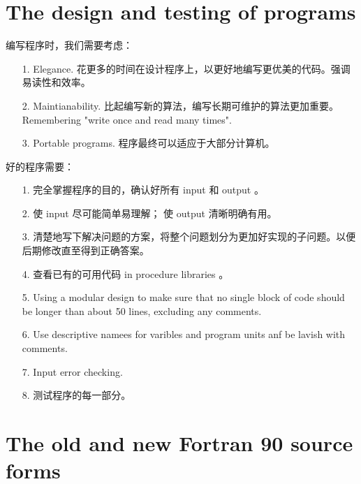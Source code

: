 \documentclass[a4paper,titlepage]{report}
\theoremstyle{definition}
\begin{document}
\section{The design and testing of programs}

编写程序时，我们需要考虑：
\begin{itemize}
  \item[1.]
  Elegance. 花更多的时间在设计程序上，以更好地编写更优美的代码。强调易读性和效率。

  \item[2.]
  Maintianability. 比起编写新的算法，编写长期可维护的算法更加重要。Remembering "write once and read many times".

  \item[3.]
  Portable programs. 程序最终可以适应于大部分计算机。

\end{itemize}

\noindent 好的程序需要：
\begin{itemize}
  \item[1.]
  完全掌握程序的目的，确认好所有 input 和 output 。

  \item[2.]
  使 input 尽可能简单易理解； 使 output 清晰明确有用。

  \item[3.]
  清楚地写下解决问题的方案，将整个问题划分为更加好实现的子问题。以便后期修改直至得到正确答案。

  \item[4.]
  查看已有的可用代码 in procedure libraries 。

  \item[5.]
  Using a modular design to make sure that no single block of code should be longer than about 50 lines, excluding any comments.

  \item[6.]
  Use descriptive namees for varibles and program units anf be lavish with comments.

  \item[7.]
  Input error checking.

  \item[8.]
  测试程序的每一部分。

\end{itemize}

\section{The old and new Fortran 90 source forms}
\end{document}
